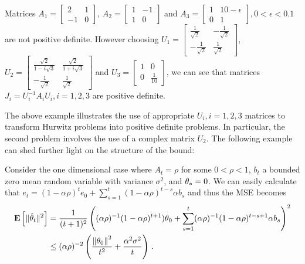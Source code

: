\begin{example}\label{ex:pdas}
Matrices $A_1=\begin{bmatrix} 2 &1 \\-1 &0\end{bmatrix}$,
$A_2=\begin{bmatrix}1 & -1\\ 1 &0 \end{bmatrix}$ and $A_3=\begin{bmatrix} 1 & 10-\epsilon \\ 0 &1 \end{bmatrix},0<\epsilon<0.1$ are not positive definite. However choosing $U_1=\begin{bmatrix} \frac{1}{\sqrt{2}}& -\frac{1}{\sqrt{2}}\\ -\frac{1}{\sqrt{2}} &\frac{1}{\sqrt{2}} \end{bmatrix}$, $U_2=\begin{bmatrix} \frac{\sqrt{2}}{1-i\sqrt{3}} & \frac{\sqrt{2}}{1+i\sqrt{3}} \\ -\frac{1}{\sqrt{2}} &\frac{1}{\sqrt{2}}\end{bmatrix}$ and $U_3=\begin{bmatrix} 1 & 0\\ 0 &\frac{1}{10} \end{bmatrix}$, we can see that matrices $J_i=U_i^{-1}A_i U_i,i=1,2,3$ are positive definite.
\end{example}
The above example  illustrates the use of appropriate $U_i,i=1,2,3$ matrices to transform Hurwitz problems into positive definite problems. In particular, the second problem involves the use of a complex matrix $U_2$.
\fi
{}
The following example can shed further light on the structure of the bound:%
\begin{example}\label{ex:geo}
Consider the one dimensional case where $A_t=\rho$ for some $0<\rho<1$, $b_t$ a bounded \iid zero mean random variable with variance $\sigma^2$, and $\theta_*=0$. We can easily calculate 
that $e_t=(1-\alpha\rho)^t e_0+\sum_{s=1}^t (1-\alpha \rho)^{t-s}\alpha b_s$ and thus the MSE becomes 
\begin{align*}
\mathbf{E}\left[\| \hat{\theta}_t\|^2\right]&=\frac{1}{(t+1)^2}\left( (\alpha\rho)^{-1}(1-\alpha\rho)^{t+1}) \theta_0+ \sum_{s=1}^t (\alpha\rho)^{-1}(1-\alpha \rho)^{t-s+1} \alpha b_s\right)^2\\
&\leq (\alpha\rho)^{-2}\left(\frac{\left\| \theta_0\right\|^2}{t^2}+\frac{\alpha^2\sigma^2}{t}\right)\,.
\end{align*}
\end{example}

